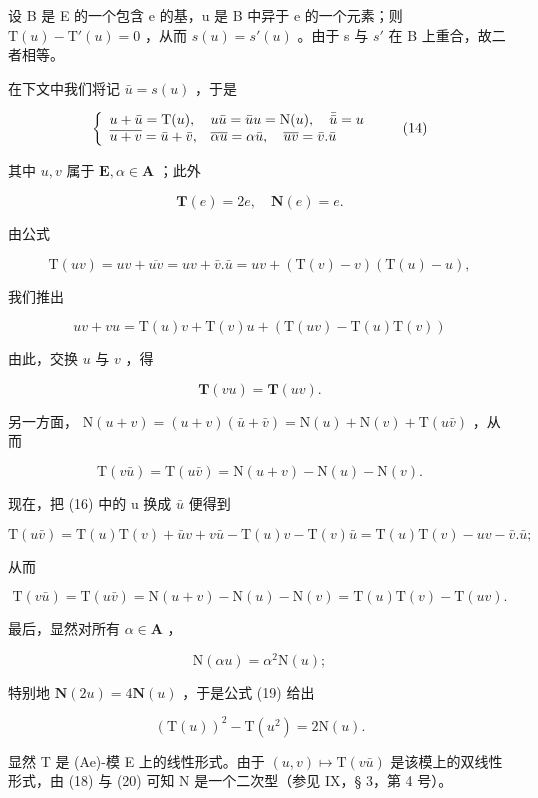 设 B 是 E 的一个包含 e 的基，u 是 B 中异于 e 的一个元素；则 \(\mathrm{T}(u) - \mathrm{T}'(u) = 0\) ，从而 \(s(u) = s'(u)\) 。由于 s 与 \(s'\) 在 B 上重合，故二者相等。

在下文中我们将记 \(\bar{u} = s(u)\) ，于是

\[
\left\{ \begin{array}{l l} u + \bar {u} = \mathrm{T} (u), & u \bar {u} = \bar {u} u = \mathrm{N} (u), \quad \bar {\bar {u}} = u \\ \overline {{u + v}} = \bar {u} + \bar {v}, & \overline {{\alpha u}} = \alpha \bar {u}, \quad \overline {{u v}} = \bar {v}. \bar {u} \end{array} \right.\tag{14}
\]

其中 \(u, v\) 属于 \(\mathbf{E}, \alpha \in \mathbf{A}\) ；此外

\[
\mathbf {T} (e) = 2 e, \quad \mathbf {N} (e) = e.\tag{15}
\]

由公式

\[
\mathrm{T} (u v) = u v + \overline {{{{u v}}}} = u v + \bar {v}. \bar {u} = u v + (\mathrm{T} (v) - v) (\mathrm{T} (u) - u),
\]

我们推出

\[
u v + v u = \mathrm{T} (u) v + \mathrm{T} (v) u + (\mathrm{T} (u v) - \mathrm{T} (u) \mathrm{T} (v))\tag{16}
\]

由此，交换 \(u\) 与 \(v\) ，得

\[
\mathbf {T} (v u) = \mathbf {T} (u v).\tag{17}
\]

另一方面， \(\mathrm{N}(u+v)=(u+v)(\bar{u}+\bar{v})=\mathrm{N}(u)+\mathrm{N}(v)+\mathrm{T}(u\bar{v})\) ，从而

\[
\mathrm{T} (v \bar {u}) = \mathrm{T} (u \bar {v}) = \mathrm{N} (u + v) - \mathrm{N} (u) - \mathrm{N} (v).\tag{18}
\]

现在，把 (16) 中的 u 换成 \(\bar{u}\) 便得到

\[
\mathrm{T} (u \bar {v}) = \mathrm{T} (u) \mathrm{T} (v) + \bar {u} v + v \bar {u} - \mathrm{T} (u) v - \mathrm{T} (v) \bar {u} = \mathrm{T} (u) \mathrm{T} (v) - u v - \bar {v}. \bar {u};
\]

从而

\[
\mathrm{T} (v \bar {u}) = \mathrm{T} (u \bar {v}) = \mathrm{N} (u + v) - \mathrm{N} (u) - \mathrm{N} (v) = \mathrm{T} (u) \mathrm{T} (v) - \mathrm{T} (u v).\tag{19}
\]

最后，显然对所有 \(\alpha \in \mathbf{A}\) ，

\[
\mathrm{N} (\alpha u) = \alpha^ {2} \mathrm{N} (u);\tag{20}
\]

特别地 \(\mathbf{N}(2u) = 4\mathbf{N}(u)\) ，于是公式 (19) 给出

\[
(\mathrm{T} (u)) ^ {2} - \mathrm{T} (u ^ {2}) = 2 \mathrm{N} (u).\tag{21}
\]

显然 T 是 (Ae)-模 E 上的线性形式。由于 \((u, v) \mapsto \mathrm{T}(v\bar{u})\) 是该模上的双线性形式，由 (18) 与 (20) 可知 N 是一个二次型（参见 IX，§ 3，第 4 号）。

